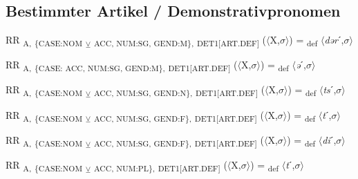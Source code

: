 {\subsection{Bestimmter Artikel / Demonstrativpronomen}

\begin{exe}
 RR \textsubscript{A,} \textsubscript{\{CASE:NOM} \textsubscript{${\veebar}$}\textsubscript{ ACC, NUM:SG, GEND:M\},} \textsubscript{DET1[ART.DEF]} ($\langle$X,$\sigma $$\rangle$) = \textsubscript{def} $\langle$\textit{dər}ˊ,$\sigma $$\rangle$
\end{exe}

\begin{exe}
 RR \textsubscript{A,} \textsubscript{\{CASE: ACC, NUM:SG, GEND:M\},} \textsubscript{DET1[ART.DEF]} ($\langle$X,$\sigma $$\rangle$) = \textsubscript{def} $\langle$\textit{ə}ˊ,$\sigma $$\rangle$
\end{exe}

\begin{exe}
 RR \textsubscript{A,} \textsubscript{\{CASE:NOM} \textsubscript{${\veebar}$}\textsubscript{ ACC, NUM:SG, GEND:N\},} \textsubscript{DET1[ART.DEF]} ($\langle$X,$\sigma $$\rangle$) = \textsubscript{def} $\langle$\textit{ts}ˊ,$\sigma $$\rangle$
\end{exe}

\begin{exe}
 RR \textsubscript{A,} \textsubscript{\{CASE:NOM} \textsubscript{${\veebar}$}\textsubscript{ ACC, NUM:SG, GEND:F\},} \textsubscript{DET1[ART.DEF]} ($\langle$X,$\sigma $$\rangle$) = \textsubscript{def} $\langle$\textit{t}ˊ,$\sigma $$\rangle$
\end{exe}

\begin{exe}
 RR \textsubscript{A,} \textsubscript{\{CASE:NOM} \textsubscript{${\veebar}$}\textsubscript{ ACC, NUM:SG, GEND:F\},} \textsubscript{DET1[ART.DEF]} ($\langle$X,$\sigma $$\rangle$) = \textsubscript{def} $\langle$\textit{di}ˊ,$\sigma $$\rangle$
\end{exe}

\begin{exe}
 RR \textsubscript{A,} \textsubscript{\{CASE:NOM} \textsubscript{${\veebar}$}\textsubscript{ ACC, NUM:PL\},} \textsubscript{DET1[ART.DEF]} ($\langle$X,$\sigma $$\rangle$) = \textsubscript{def} $\langle$\textit{t}ˊ,$\sigma $$\rangle$
\end{exe}

}
